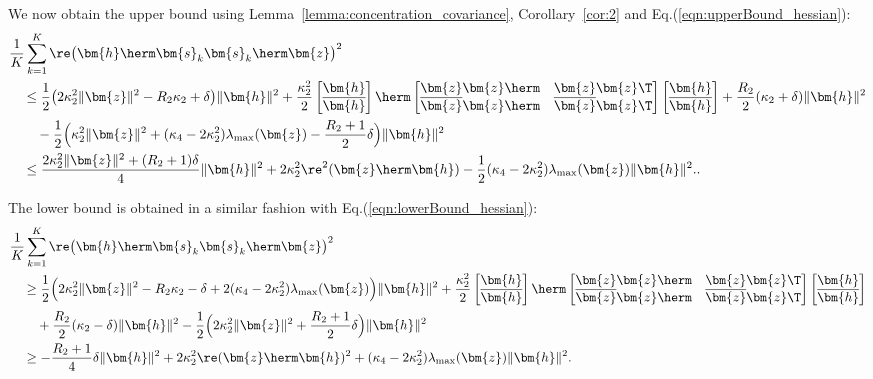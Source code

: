 We now obtain the upper bound using Lemma~\ref{lemma:concentration_covariance}, Corollary~\ref{cor:2} and Eq.(\ref{eqn:upperBound_hessian}):
\begin{align}
&\frac{1}{K}\sum_{k=1}^K\re\big(\bm{h}\herm\bm{s}_k\bm{s}_k\herm\bm{z}\big)^2
\nonumber\\
&\quad\leq\frac{1}{2}
\big(2\kappa_2^2\|\bm{z}\|^2-R_2\kappa_2+\delta\big)\|\bm{h}\|^2+ \frac{\kappa_2^2}{2}\begin{bmatrix}
\bm{h}\\\overline{\bm{h}}
\end{bmatrix}\herm\begin{bmatrix}
\bm{z}\bm{z}\herm&\bm{z}\bm{z}\T\\
\overline{\bm{z}}\bm{z}\herm&\overline{\bm{z}}\bm{z}\T\end{bmatrix}
\begin{bmatrix}
\bm{h}\\\overline{\bm{h}}
\end{bmatrix}+\frac{R_2}{2}(\kappa_2+\delta)\|\bm{h}\|^2\nonumber\\
&\qquad-\frac{1}{2}\Big(\kappa_2^2\|\bm{z}\|^2+ (\kappa_4-2\kappa_2^2)\lambda_{\mathrm{max}}(\bm{z})-\frac{R_2+1}{2}\delta\Big)\|\bm{h}\|^2\nonumber\\
&\quad\leq\frac{2\kappa_2^2\|\bm{z}\|^2+(R_2+1)\delta}{4}\|\bm{h}\|^2+2\kappa_2^2\re^2(\bm{z}\herm\bm{h}) -\frac{1}{2}(\kappa_4-2\kappa_2^2)\lambda_{\mathrm{max}}(\bm{z})\|\bm{h}\|^2..
\end{align}

The lower bound is obtained in a similar fashion with Eq.(\ref{eqn:lowerBound_hessian}):
\begin{align}
&\frac{1}{K}\sum_{k=1}^K\re\big(\bm{h}\herm\bm{s}_k\bm{s}_k\herm\bm{z}\big)^2\nonumber\\
&\quad\geq\frac{1}{2}\Big(
2\kappa_2^2\|\bm{z}\|^2-R_2\kappa_2-\delta +2(\kappa_4-2\kappa_2^2)\lambda_{\mathrm{max}}(\bm{z})\Big)\|\bm{h}\|^2
+ \frac{\kappa_2^2}{2}\begin{bmatrix}
\bm{h}\\\overline{\bm{h}}
\end{bmatrix}\herm\begin{bmatrix}
\bm{z}\bm{z}\herm&\bm{z}\bm{z}\T\\
\overline{\bm{z}}\bm{z}\herm&\overline{\bm{z}}\bm{z}\T\end{bmatrix}
\begin{bmatrix}
\bm{h}\\\overline{\bm{h}}
\end{bmatrix}\nonumber\\
&\quad\quad +\frac{R_2}{2}(\kappa_2-\delta)\|\bm{h}\|^2- \frac{1}{2}\Big(2\kappa_2^2\|\bm{z}\|^2+\frac{R_2+1}{2}\delta\Big)\|\bm{h}\|^2\nonumber\\
&\quad\geq-\frac{R_2+1}{4}\delta\|\bm{h}\|^2+2\kappa_2^2\re(\bm{z}\herm\bm{h})^2+(\kappa_4-2\kappa_2^2)\lambda_{\mathrm{max}}(\bm{z})\|\bm{h}\|^2.
\end{align}
	
